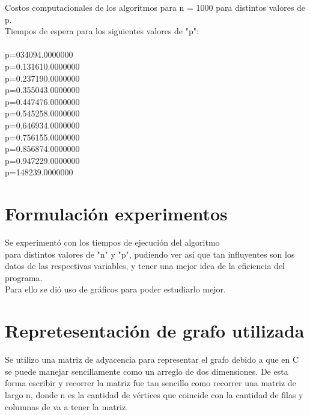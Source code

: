 \documentclass[12pt,letterpaper]{scrartcl}
\begin{document}
Costos computacionales de los algoritmos para n = 1000 para distintos valores de p.
\\
Tiempos de espera para los siguientes valores de "p":
\\\\
p=0\hspace{1cm}34094.0000000
\\
p=0.1\hspace{1cm}31610.0000000
\\
p=0.2\hspace{1cm}37190.0000000
\\
p=0.3\hspace{1cm}55043.0000000
\\
p=0.4\hspace{1cm}47476.0000000
\\
p=0.5\hspace{1cm}45258.0000000
\\
p=0.6\hspace{1cm}46934.0000000
\\
p=0.7\hspace{1cm}56155.0000000
\\
p=0.8\hspace{1cm}56874.0000000
\\
p=0.9\hspace{1cm}47229.0000000
\\
p=1\hspace{1cm}48239.0000000


\newpage
\section{Formulación experimentos}

Se experimentó con los tiempos de ejecución del algoritmo\\ para distintos valores de "n" y "p", pudiendo ver así que tan influyentes son los datos de las respectivas variables, y tener una mejor idea de la eficiencia del programa.
\\
Para ello se dió uso de gráficos para poder estudiarlo mejor.

\section{Repretesentación de grafo utilizada}

Se utilizo una matriz de adyacencia para representar el grafo debido a que en C se puede manejar sencillamente como un arreglo de dos dimensiones. De esta forma escribir y recorrer la matriz fue tan sencillo como recorrer una matriz de largo n, donde n es la cantidad de vértices que coincide con la cantidad de filas y columnas de va a tener la matriz.
\end{document}
